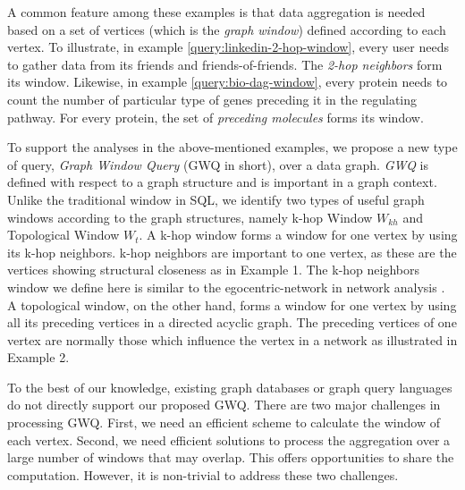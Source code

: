 A common feature among these examples is that data aggregation is needed based on a set of vertices (which is the {\em graph window}) 
defined according to each vertex.  To illustrate, in example \ref{query:linkedin-2-hop-window}, every user needs to gather data from its friends and friends-of-friends. 
The \emph{2-hop neighbors} form its window. Likewise, in example \ref{query:bio-dag-window}, every protein needs to count the number of particular type of genes preceding it in the regulating pathway. For every protein, the set of
\emph{preceding molecules} forms its window. 

To support the analyses in the above-mentioned examples, we propose a new 
type of query, \emph{Graph Window Query} (GWQ in short),
over a data graph. \emph{GWQ} is defined with respect to a graph structure 
and is important in a graph context. Unlike the traditional window in SQL, 
we identify two types of useful graph windows according to the 
graph structures, namely k-hop Window $W_{kh}$ and Topological Window $W_t$. 
A k-hop window forms a window for one vertex by using its k-hop neighbors. 
k-hop neighbors are important to one vertex, as these are the vertices 
showing structural closeness as in Example 1. The k-hop neighbors window 
we define here is similar to the egocentric-network in network analysis \cite{burt2009structural} \cite{mondal2014eagr}. A topological window, on the
other hand, forms a window for one vertex by using all its preceding 
vertices in a directed acyclic graph. The preceding vertices of one vertex are normally those which influence the vertex in a network as illustrated in Example 2. 

To the best of our knowledge, existing graph databases or graph query languages do not directly support our proposed GWQ. There are two major challenges in processing GWQ. First, we need an efficient scheme to  calculate the window of each vertex. Second, we need
efficient solutions to process the aggregation over a large number 
of windows that may overlap. This offers opportunities to share the 
computation. However, it is non-trivial to address these two challenges.  

